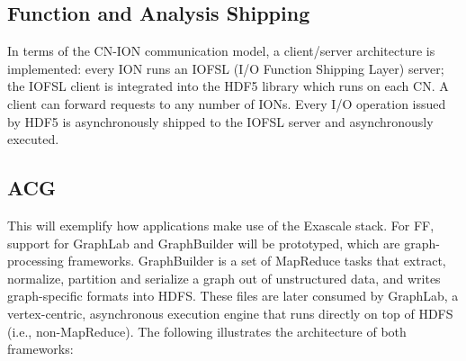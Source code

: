 \documentclass[conference]{IEEEtran}
\newcommand{\DDTns}{D\textsuperscript{2}T}
\begin{document}
%

\subsection{Function and Analysis Shipping}
\label{sec:fn-shipping}

In terms of the CN-ION communication model, a client/server architecture
is implemented: every ION runs an IOFSL (I/O Function Shipping
Layer) server; the IOFSL client is integrated into the HDF5
library which runs on each CN. A client can forward requests to any
number of IONs. Every I/O operation issued by HDF5 is asynchronously
shipped to the IOFSL server and asynchronously executed.

\subsection{ACG}
\label{sec:acg}

This will exemplify how applications make use of the Exascale stack. For
FF, support for
GraphLab 
and GraphBuilder will be prototyped, which are graph-processing
frameworks. GraphBuilder is a set of MapReduce tasks that extract,
normalize, partition and serialize a graph out of unstructured data, and
writes graph-specific formats into HDFS. These files are later consumed
by GraphLab, a vertex-centric, asynchronous execution engine that runs
directly on top of HDFS (i.e., non-MapReduce). The following illustrates
the architecture of both frameworks:
\end{document}

